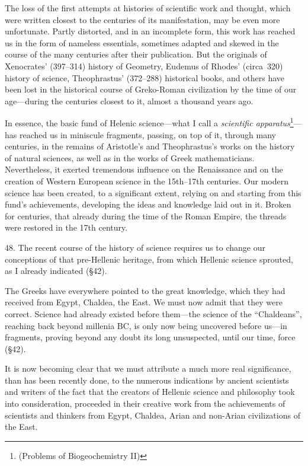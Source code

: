 The loss of the first attempts at histories of scientific work and thought,
which were written closest to the centuries of its manifestation, may be even
more unfortunate.  Partly distorted, and in an incomplete form, this work has
reached us in the form of nameless essentials, sometimes adapted and skewed in
the course of the many centuries after their publication.  But the originals of
Xenocrates' (397--314) history of Geometry, Eudemus of Rhodes' (circa~320)
history of science, Theophrastus' (372--288) historical books, and others have
been lost in the historical course of Greko-Roman civilization by the time of
our age---during the centuries closest to it, almost a thousand years ago.

In essence, the basic fund of Helenic science---what I call a \emph{scientific
apparatus}\footnote{
	\foreignlanguage{russian}{
	(Problems of Biogeochemistry II)}
}---has reached us in miniscule fragments, passing, on top of it, through many
centuries, in the remains of Aristotle's and Theophrastus's works on the
history of natural sciences, as well as in the works of Greek mathematicians.
Nevertheless, it exerted tremendous influence on the Renaissance and on the
creation of Western European science in the 15th--17th centuries.  Our modern
science has been created, to a significant extent, relying on and starting from
this fund's achievements, developing the ideas and knowledge laid out in it.
Broken for centuries, that already during the time of the Roman Empire, the
threads were restored in the 17th century.


48. The recent course of the history of science requires us to change
our conceptions of that pre-Hellenic heritage, from which Hellenic science
sprouted, as I already indicated (§42).

The Greeks have everywhere pointed to the great knowledge, which they had
received from Egypt, Chaldea, the East.  We must now admit that they were
correct.  Science had already existed before them---the science of the
``Chaldeans'', reaching back beyond millenia BC, is only now being uncovered
before us---in fragments, proving beyond any doubt its long unsuspected, until
our time, force (§42).

It is now becoming clear that we must attribute a much more real significance,
than has been recently done, to the numerous indications by ancient scientists
and writers of the fact that the creators of Hellenic science and philosophy
took into consideration, proceeded in their creative work from the achievements
of scientists and thinkers from Egypt, Chaldea, Arian and non-Arian
civilizations of the East.

